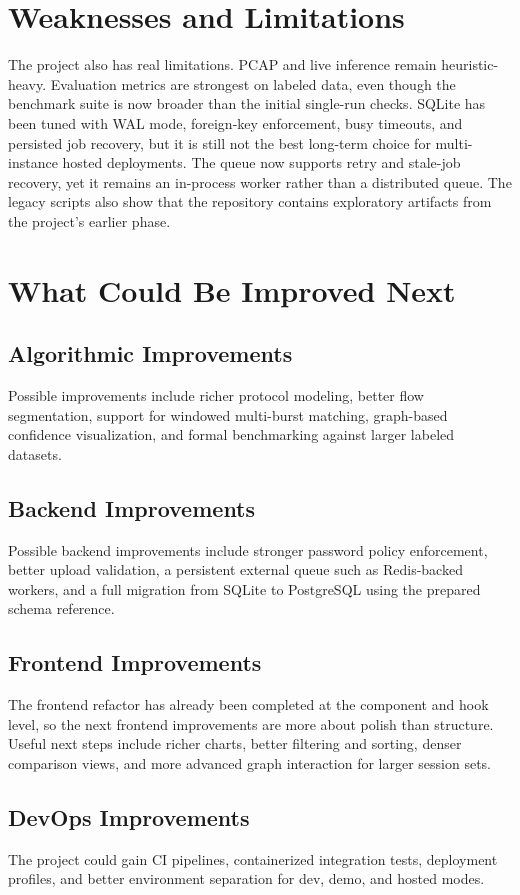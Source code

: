 \documentclass[12pt,a4paper]{report}
\begin{document}
\chapter{Weaknesses and Limitations}
The project also has real limitations. PCAP and live inference remain heuristic-heavy. Evaluation metrics are strongest on labeled data, even though the benchmark suite is now broader than the initial single-run checks. SQLite has been tuned with WAL mode, foreign-key enforcement, busy timeouts, and persisted job recovery, but it is still not the best long-term choice for multi-instance hosted deployments. The queue now supports retry and stale-job recovery, yet it remains an in-process worker rather than a distributed queue. The legacy scripts also show that the repository contains exploratory artifacts from the project’s earlier phase.

\chapter{What Could Be Improved Next}
\section{Algorithmic Improvements}
Possible improvements include richer protocol modeling, better flow segmentation, support for windowed multi-burst matching, graph-based confidence visualization, and formal benchmarking against larger labeled datasets.

\section{Backend Improvements}
Possible backend improvements include stronger password policy enforcement, better upload validation, a persistent external queue such as Redis-backed workers, and a full migration from SQLite to PostgreSQL using the prepared schema reference.

\section{Frontend Improvements}
The frontend refactor has already been completed at the component and hook level, so the next frontend improvements are more about polish than structure. Useful next steps include richer charts, better filtering and sorting, denser comparison views, and more advanced graph interaction for larger session sets.

\section{DevOps Improvements}
The project could gain CI pipelines, containerized integration tests, deployment profiles, and better environment separation for dev, demo, and hosted modes.
\end{document}
